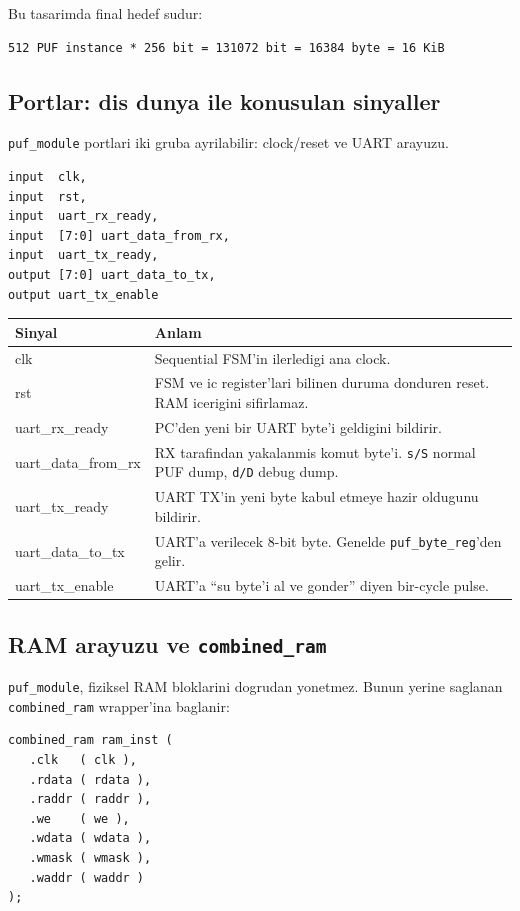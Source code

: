 \documentclass[11pt,a4paper]{article}
\begin{document}
Bu tasarimda final hedef sudur:
\begin{lstlisting}[style=bashstyle]
512 PUF instance * 256 bit = 131072 bit = 16384 byte = 16 KiB
\end{lstlisting}

\subsection{Portlar: dis dunya ile konusulan sinyaller}
\texttt{puf\_module} portlari iki gruba ayrilabilir: clock/reset ve UART arayuzu.

\begin{lstlisting}[style=verilogstyle]
input  clk,
input  rst,
input  uart_rx_ready,
input  [7:0] uart_data_from_rx,
input  uart_tx_ready,
output [7:0] uart_data_to_tx,
output uart_tx_enable
\end{lstlisting}

\begin{longtable}{>{\ttfamily}p{4.2cm}p{10.4cm}}
\toprule
Sinyal & Anlam \\
\midrule
\endhead
clk & Sequential FSM'in ilerledigi ana clock. \\
rst & FSM ve ic register'lari bilinen duruma donduren reset. RAM icerigini sifirlamaz. \\
uart\_rx\_ready & PC'den yeni bir UART byte'i geldigini bildirir. \\
uart\_data\_from\_rx & RX tarafindan yakalanmis komut byte'i. \texttt{s/S} normal PUF dump, \texttt{d/D} debug dump. \\
uart\_tx\_ready & UART TX'in yeni byte kabul etmeye hazir oldugunu bildirir. \\
uart\_data\_to\_tx & UART'a verilecek 8-bit byte. Genelde \texttt{puf\_byte\_reg}'den gelir. \\
uart\_tx\_enable & UART'a ``su byte'i al ve gonder'' diyen bir-cycle pulse. \\
\bottomrule
\end{longtable}

\subsection{RAM arayuzu ve \texttt{combined\_ram}}
\texttt{puf\_module}, fiziksel RAM bloklarini dogrudan yonetmez. Bunun yerine saglanan \texttt{combined\_ram} wrapper'ina baglanir:

\begin{lstlisting}[style=verilogstyle]
combined_ram ram_inst (
   .clk   ( clk ),
   .rdata ( rdata ),
   .raddr ( raddr ),
   .we    ( we ),
   .wdata ( wdata ),
   .wmask ( wmask ),
   .waddr ( waddr )
);
\end{lstlisting}
\end{document}
